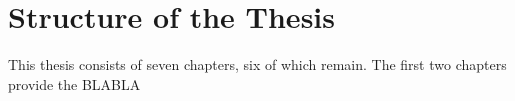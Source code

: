 

\section{Structure of the Thesis}

This thesis consists of seven chapters, six of which remain. The first two chapters provide the BLABLA